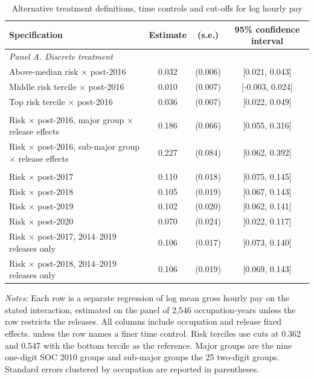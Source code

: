 \begin{table}[!ht]\centering
\caption{Alternative treatment definitions, time controls and cut-offs for log hourly pay}\label{tab:rob}
\begin{threeparttable}\footnotesize\setlength{\tabcolsep}{4pt}
\begin{tabular}{lccc}\toprule
Specification & Estimate & (s.e.) & 95\% confidence interval \\ \midrule
\multicolumn{4}{l}{\emph{Panel A. Discrete treatment}} \\
Above-median risk $\times$ post-2016 & 0.032 & (0.006) & [0.021, 0.043] \\
Middle risk tercile $\times$ post-2016 & 0.010 & (0.007) & [-0.003, 0.024] \\
Top risk tercile $\times$ post-2016 & 0.036 & (0.007) & [0.022, 0.049] \\
\addlinespace
\multicolumn{4}{l}{\emph{Panel B. Finer time controls}} \\
Risk $\times$ post-2016, major group $\times$ release effects & 0.186 & (0.066) & [0.055, 0.316] \\
Risk $\times$ post-2016, sub-major group $\times$ release effects & 0.227 & (0.084) & [0.062, 0.392] \\
\addlinespace
\multicolumn{4}{l}{\emph{Panel C. Alternative and placebo cut-offs}} \\
Risk $\times$ post-2017 & 0.110 & (0.018) & [0.075, 0.145] \\
Risk $\times$ post-2018 & 0.105 & (0.019) & [0.067, 0.143] \\
Risk $\times$ post-2019 & 0.102 & (0.020) & [0.062, 0.141] \\
Risk $\times$ post-2020 & 0.070 & (0.024) & [0.022, 0.117] \\
\addlinespace
Risk $\times$ post-2017, 2014--2019 releases only & 0.106 & (0.017) & [0.073, 0.140] \\
Risk $\times$ post-2018, 2014--2019 releases only & 0.106 & (0.019) & [0.069, 0.143] \\
\bottomrule\end{tabular}
\begin{tablenotes}\footnotesize
\item \emph{Notes:} Each row is a separate regression of log mean gross hourly pay on the stated interaction, estimated on the panel of 2,546 occupation-years unless the row restricts the releases. All columns include occupation and release fixed effects. unless the row names a finer time control. Risk terciles use cuts at 0.362 and 0.547 with the bottom tercile as the reference. Major groups are the nine one-digit SOC 2010 groups and sub-major groups the 25 two-digit groups. Standard errors clustered by occupation are reported in parentheses.

\end{tablenotes}
\end{threeparttable}
\end{table}
